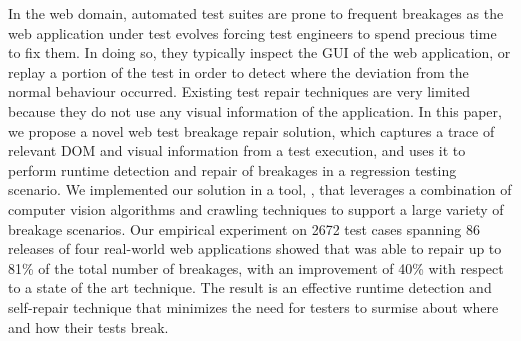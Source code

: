 In the web domain, automated test suites are prone to frequent breakages as the web application under test evolves forcing test engineers to spend precious time to fix them. In doing so, they typically inspect the GUI of the web application, or replay a portion of the test in order to detect where the deviation from the normal behaviour occurred. 
Existing test repair techniques are very limited because they do not use any visual information of the application.
In this paper, we propose a novel web test breakage repair solution, which captures a trace of relevant DOM and visual information from a test execution, and uses it to perform runtime detection and repair of breakages in a regression testing scenario. We implemented our solution in a tool, \tool, that leverages a combination of computer vision algorithms and crawling  techniques to support a large variety of breakage scenarios. Our empirical experiment on 2672 test cases spanning 86 releases of four real-world web applications showed that \tool was able to repair up to 81\% of the total number of breakages, with an improvement of 40\% with respect to a state of the art technique. The result is an effective runtime detection and self-repair technique that minimizes the need for testers to surmise about where and how their tests break.